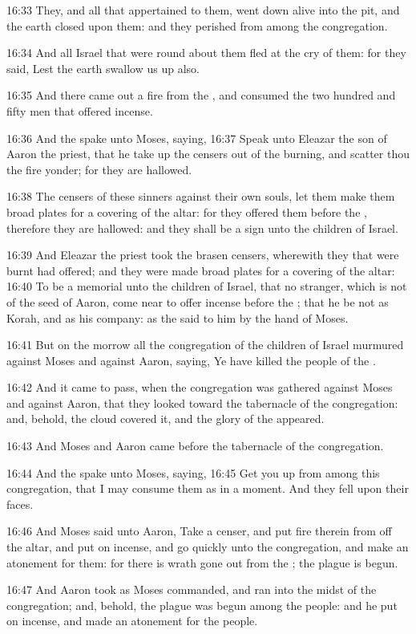 16:33 They, and all that appertained to them, went down alive into the pit, and the earth closed upon them: and they perished from among the congregation.

16:34 And all Israel that were round about them fled at the cry of them: for they said, Lest the earth swallow us up also.

16:35 And there came out a fire from the \LORD, and consumed the two hundred and fifty men that offered incense.

16:36 And the \LORD spake unto Moses, saying, 16:37 Speak unto Eleazar the son of Aaron the priest, that he take up the censers out of the burning, and scatter thou the fire yonder; for they are hallowed.

16:38 The censers of these sinners against their own souls, let them make them broad plates for a covering of the altar: for they offered them before the \LORD, therefore they are hallowed: and they shall be a sign unto the children of Israel.

16:39 And Eleazar the priest took the brasen censers, wherewith they that were burnt had offered; and they were made broad plates for a covering of the altar: 16:40 To be a memorial unto the children of Israel, that no stranger, which is not of the seed of Aaron, come near to offer incense before the \LORD; that he be not as Korah, and as his company: as the \LORD said to him by the hand of Moses.

16:41 But on the morrow all the congregation of the children of Israel murmured against Moses and against Aaron, saying, Ye have killed the people of the \LORD.

16:42 And it came to pass, when the congregation was gathered against Moses and against Aaron, that they looked toward the tabernacle of the congregation: and, behold, the cloud covered it, and the glory of the \LORD appeared.

16:43 And Moses and Aaron came before the tabernacle of the congregation.

16:44 And the \LORD spake unto Moses, saying, 16:45 Get you up from among this congregation, that I may consume them as in a moment. And they fell upon their faces.

16:46 And Moses said unto Aaron, Take a censer, and put fire therein from off the altar, and put on incense, and go quickly unto the congregation, and make an atonement for them: for there is wrath gone out from the \LORD; the plague is begun.

16:47 And Aaron took as Moses commanded, and ran into the midst of the congregation; and, behold, the plague was begun among the people: and he put on incense, and made an atonement for the people.

